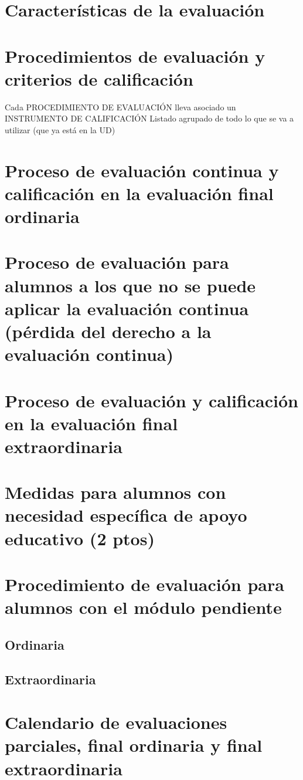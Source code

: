 \section{Características de la evaluación}
\section{Procedimientos de evaluación y criterios de calificación}

Cada PROCEDIMIENTO DE EVALUACIÓN lleva asociado un INSTRUMENTO DE CALIFICACIÓN
Listado agrupado de todo lo que se va a utilizar (que ya está en la UD)


\section{Proceso de evaluación continua y calificación en la evaluación final ordinaria}
\section{Proceso de evaluación para alumnos a los que no se puede aplicar la evaluación continua (pérdida del derecho a la evaluación continua)}
\section{Proceso de evaluación y calificación en la evaluación final extraordinaria}
\section{Medidas para alumnos con necesidad específica de apoyo educativo (2 ptos)}
\section{Procedimiento de evaluación para alumnos con el módulo pendiente}

\subsection{Ordinaria}
\subsection{Extraordinaria}
\section{Calendario de evaluaciones parciales, final ordinaria y final extraordinaria}
